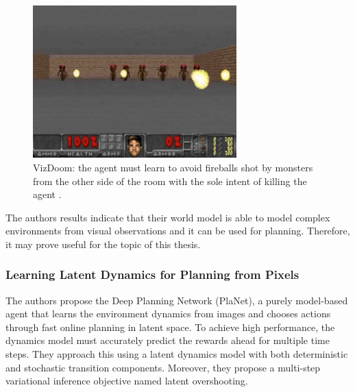 \begin{figure}[H]
\includegraphics[width=0.7\textwidth,keepaspectratio]{figures/VizDoom.png}
\caption[VizDoom]{VizDoom: the agent must learn to avoid fireballs shot by monsters from the other side of the room with the sole intent of killing the agent \protect\cite{Algo.WorldModels}.}
\label{Fig.VizDoom}
\end{figure}

The authors results indicate that their world model is able to model complex environments from visual observations and it can be used for planning. Therefore, it may prove useful for the topic of this thesis.

\subsubsection{Learning Latent Dynamics for Planning from Pixels}

The authors propose the Deep Planning Network \cite{Algo.PlaNet} (PlaNet), a purely model-based agent that learns the environment dynamics from images and chooses actions through fast online planning in latent space. To achieve high performance, the dynamics model must accurately predict the rewards ahead for multiple time steps. They approach this using a latent dynamics model with both deterministic and stochastic transition components. Moreover, they propose a multi-step variational inference objective named latent overshooting.

